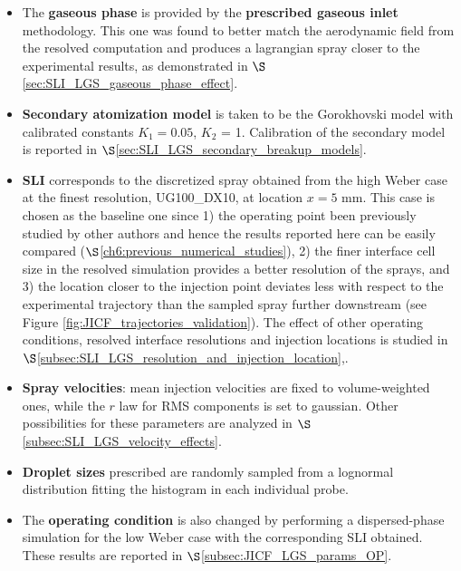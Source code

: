 \begin{itemize}

	\item The \textbf{gaseous phase} is provided by the \textbf{prescribed gaseous inlet} methodology. This one was found to better match the aerodynamic field from the resolved computation and produces a lagrangian spray closer to the experimental results, as demonstrated in $\S$\ref{sec:SLI_LGS_gaseous_phase_effect}.
	
	\item \textbf{Secondary atomization model} is taken to be the Gorokhovski model with calibrated constants $K_1 = 0.05$, $K_2$ = 1. Calibration of the secondary model is reported in $\S$\ref{sec:SLI_LGS_secondary_breakup_models}.
	
	\item \textbf{SLI} corresponds to the discretized spray obtained from the high Weber case at the finest resolution, UG100\_DX10, at location $x = 5$ mm. This case is chosen as the baseline one since 1) the operating point been previously studied by other authors and hence the results reported here can be easily compared ($\S$\ref{ch6:previous_numerical_studies}), 2) the finer interface cell size in the resolved simulation provides a better resolution of the sprays, and 3) the location closer to the injection point deviates less with respect to the experimental trajectory than the sampled spray further downstream (see Figure \ref{fig:JICF_trajectories_validation}). The effect of other operating conditions, resolved interface resolutions and injection locations is studied in $\S$\ref{subsec:SLI_LGS_resolution_and_injection_location},.
	
	\item \textbf{Spray velocities}: mean injection velocities are fixed to volume-weighted ones, while the $r$ law for RMS components is set to gaussian. Other possibilities for these parameters are analyzed in $\S$\ref{subsec:SLI_LGS_velocity_effects}.
	
	\item \textbf{Droplet sizes} prescribed are randomly sampled from a lognormal distribution fitting the histogram in each individual probe. 
	
	\item The \textbf{operating condition} is also changed by performing a dispersed-phase simulation for the low Weber case with the corresponding SLI obtained. These results are reported in $\S$\ref{subsec:JICF_LGS_params_OP}.

\end{itemize}





\clearpage


